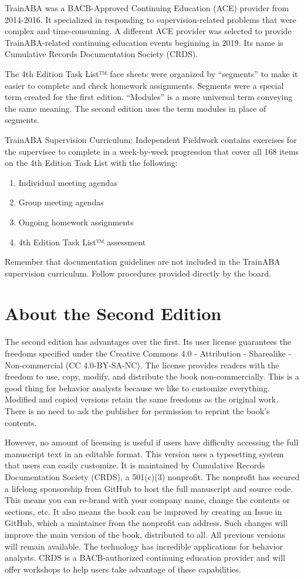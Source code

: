 TrainABA was a BACB\textregistered{}-Approved Continuing Education (ACE) provider from 2014-2016. It specialized in responding to supervision-related problems that were complex and time-consuming. A different ACE provider was selected to provide TrainABA-related continuing education events beginning in 2019. Its name is Cumulative Records Documentation Society (CRDS). 

The 4th Edition Task List™ face sheets were organized by ``segments'' to make it easier to complete and check homework assignments. Segments were a special term created for the first edition. ``Modules'' is a more universal term conveying the same meaning. The second edition uses the term modules in place of segments. 

TrainABA Supervision Curriculum: Independent Fieldwork contains exercises for the supervisee to complete in a week-by-week progression that cover all 168 items on the 4th Edition Task List with the following:
\begin{enumerate}
\item Individual meeting agendas
\item Group meeting agendas
\item Ongoing homework assignments
\item 4th Edition Task List™ assessment
\end{enumerate}

Remember that documentation guidelines are not included in the TrainABA supervision curriculum. Follow procedures provided directly by the board.
 
\section{About the Second Edition}
The second edition has advantages over the first. Its user license guarantees the freedoms specified under the Creative Commons 4.0 - Attribution - Sharealike - Non-commercial (CC 4.0-BY-SA-NC). The license provides readers with the freedom to use, copy, modify, and distribute the book non-commercially. This is a good thing for behavior analysts because we like to customize everything. Modified and copied versions retain the same freedoms as the original work. There is no need to ask the publisher for permission to reprint the book's contents. 

However, no amount of licensing is useful if users have difficulty accessing the full manuscript text in an editable format. This version uses a typesetting system that users can easily customize. It is maintained by Cumulative Records Documentation Society (CRDS), a 501(c)(3) nonprofit. The nonprofit has secured a lifelong sponsorship from GitHub to host the full manuscript and source code. This means you can re-brand with your company name, change the contents or sections, etc. It also means the book can be improved by creating an Issue in GitHub, which a maintainer from the nonprofit can address. Such changes will improve the main version of the book, distributed to all. All previous versions will remain available. The technology has incredible applications for behavior analysts. CRDS is a BACB-authorized continuing education provider and will offer workshops to help users take advantage of these capabilities.

